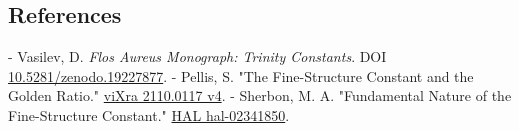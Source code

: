 \subsection{References}

- Vasilev, D. \textit{Flos Aureus Monograph: Trinity Constants}. DOI \href{https://zenodo.org/doi/10.5281/zenodo.19227877}{10.5281/zenodo.19227877}.
- Pellis, S. "The Fine-Structure Constant and the Golden Ratio." \href{https://vixra.org/pdf/2110.0117v4.pdf}{viXra 2110.0117 v4}.
- Sherbon, M. A. "Fundamental Nature of the Fine-Structure Constant." \href{https://hal.science/hal-02341850/document}{HAL hal-02341850}.
